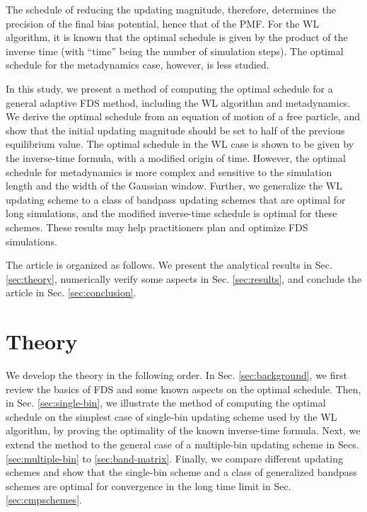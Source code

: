 \documentclass[reprint, floatfix]{revtex4-1}
\begin{document}
The schedule of reducing
the updating magnitude,
therefore,
determines the precision of the final bias potential,
hence that of the PMF\cite{liang2007,
belardinelli2007, belardinelli2007jcp, belardinelli2008,
morozov2007, zhou2008, morozov2009,
komura2012, caparica2012, caparica2014,
barducci2008, dickson2011, dama2014}.
%
For the WL algorithm, it is known
that the optimal schedule
is given by the product of the
inverse time\cite{liang2007,
belardinelli2007, belardinelli2007jcp, belardinelli2008,
morozov2007, zhou2008}
(with ``time'' being
the number of simulation steps).
%
The optimal schedule for the metadynamics case,
however, is less studied.


In this study,
we present a method of computing
the optimal schedule
for a general adaptive FDS method,
including the WL algorithm and metadynamics.
%
We derive the optimal schedule
from an equation of motion of a free particle,
and show that the initial updating magnitude
should be set to
half of the previous equilibrium value.
%
The optimal schedule in the WL case
is shown to be given by
the inverse-time formula,
with a modified origin of time.
%
However,
the optimal schedule for metadynamics is more complex
and sensitive to the simulation length
and the width of the Gaussian window.
%
Further, we generalize
the WL updating scheme
to a class of bandpass updating schemes
that are optimal for long simulations,
and the modified inverse-time schedule is optimal for these schemes.
%
%
These results may help practitioners
plan and optimize FDS simulations.



The article is organized as follows.
%
We present the analytical results in Sec. \ref{sec:theory},
numerically verify some aspects
in Sec. \ref{sec:results},
and conclude the article
in Sec. \ref{sec:conclusion}.




\section{\label{sec:theory}
Theory}



We develop the theory
in the following order.
%
In Sec. \ref{sec:background},
we first review the basics of FDS
and some known aspects on the optimal schedule.
%
%
Then, in Sec. \ref{sec:single-bin},
we illustrate the method of
computing the optimal schedule
on the simplest case of
single-bin updating scheme
used by the WL algorithm,
by proving the optimality
of the known inverse-time formula.
%
Next, we extend the method to the general case
of a multiple-bin updating scheme
in Secs. \ref{sec:multiple-bin}
to \ref{sec:band-matrix}.
%
Finally, we compare different updating schemes
and show that the single-bin scheme
and a class of generalized bandpass schemes
are optimal for convergence
in the long time limit
in Sec. \ref{sec:cmpschemes}.
\end{document}
